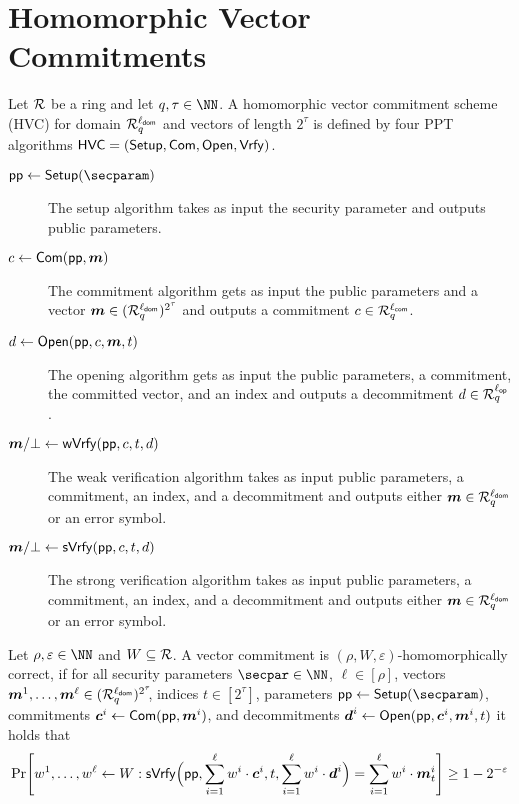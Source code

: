 \section{Homomorphic Vector Commitments}\label{sec:veccom}

\begin{definition}\label{def:hvc}
  Let $\mathcal{R}$ be a ring and let $q,\tau\in\NN$.
  A homomorphic vector commitment scheme (HVC) for domain $\mathcal{R}^{\ell_{\mathsf{dom}}}_q$ and vectors of length $2^\tau$ is defined by four PPT algorithms $\mathsf{HVC}=(\mathsf{Setup},\mathsf{Com},\allowbreak\mathsf{Open},\mathsf{Vrfy})$.
\begin{description}
    \item[$\params\gets\setup(\secparam)$] The setup algorithm takes as input the security parameter and outputs public parameters.
    \item[$c \gets \mathsf{Com}(\mathsf{pp},\boldsymbol{m})$] The commitment algorithm gets as input the public parameters and a vector $\boldsymbol{m}\in(\mathcal{R}_q^{\ell_{\mathsf{dom}}})^{2^\tau}$ and outputs a commitment $c\in\mathcal{R}_q^{\ell_{\mathsf{com}}}$.
    \item[$d \gets \mathsf{Open}(\mathsf{pp},c,\boldsymbol{m},t)$] The opening algorithm gets as input the public parameters, a commitment, the committed vector, and an index and outputs a decommitment $d\in\mathcal{R}_q^{{\ell_{\mathsf{op}}}}$.
    \item[$\boldsymbol{m}/\bot\gets \mathsf{wVrfy}(\mathsf{pp},c,t,d)$] The weak verification algorithm takes as input public parameters, a commitment, an index, and a decommitment and outputs either $\boldsymbol{m}\in\mathcal{R}^{\ell_{\mathsf{dom}}}_q$ or an error symbol.
    \item[$\boldsymbol{m}/\bot\gets \mathsf{sVrfy}(\mathsf{pp},c,t,d)$] The strong verification algorithm takes as input public parameters, a commitment, an index, and a decommitment and outputs either $\boldsymbol{m}\in\mathcal{R}^{\ell_{\mathsf{dom}}}_q$ or an error symbol.
  \end{description}
  Let $\rho,\varepsilon\in\NN$ and $W\subseteq\mathcal{R}$.
  A vector commitment is $(\rho,W,\varepsilon)$-homomorphically correct, if for all security parameters $\secpar\in\NN$, $\ell\in[\rho]$, vectors $\boldsymbol{m}^1,\dots,\boldsymbol{m}^{\ell}\in(\mathcal{R}_q^{\ell_{\mathsf{dom}}})^{2^\tau}\!\!$, indices $t\in[2^\tau]$, parameters $\params \gets \setup(\secparam)$, commitments $\boldsymbol{c}^i \gets \mathsf{Com}(\mathsf{pp},\boldsymbol{m}^i)$, and decommitments $\boldsymbol{d}^i \gets \mathsf{Open}(\mathsf{pp},\boldsymbol{c}^i,\boldsymbol{m}^i,t)$ it holds that
  \[
    \Pr\mleft[
      w^1,\dots,w^{\ell} \gets W :
      \sverify\Bigl(\params,\sum_{i=1}^{\ell}w^i\cdot \vec{c}^i,t,\sum_{i=1}^{\ell}w^i\cdot \vec{d}^i\Bigr) = \sum_{i=1}^{\ell}w^i\cdot\vec{m}^i_{t}
    \mright] \geq 1-2^{-\varepsilon}
  \]
\end{definition}

